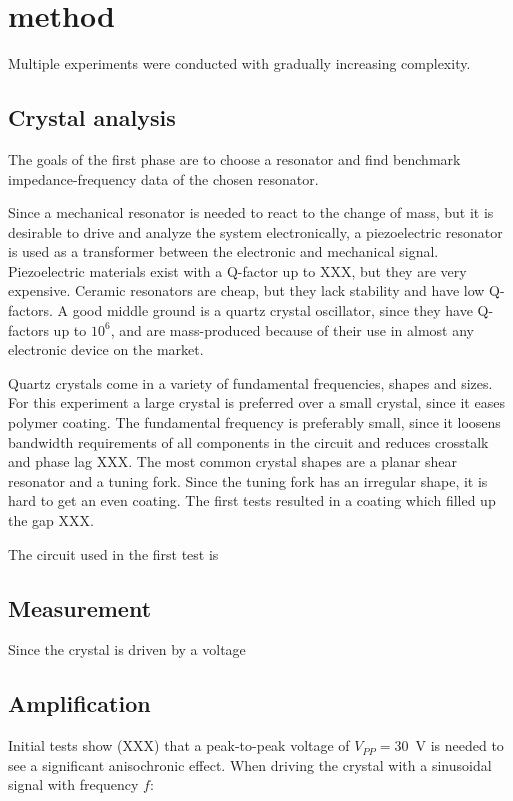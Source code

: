 \section{method}
Multiple experiments were conducted with gradually increasing complexity. 

\subsection{Crystal analysis}
The goals of the first phase are to choose a resonator and find benchmark impedance-frequency data of the chosen resonator. 

Since a mechanical resonator is needed to react to the change of mass, but it is desirable to drive and analyze the system electronically, a piezoelectric resonator is used as a transformer between the electronic and mechanical signal. Piezoelectric materials exist with a Q-factor up to XXX, but they are very expensive. Ceramic resonators are cheap, but they lack stability and have low Q-factors. A good middle ground is a quartz crystal oscillator, since they have Q-factors up to $10^6$, and are mass-produced because of their use in almost any electronic device on the market. 

Quartz crystals come in a variety of fundamental frequencies, shapes and sizes. For this experiment a large crystal is preferred over a small crystal, since it eases polymer coating. The fundamental frequency is preferably small, since it loosens bandwidth requirements of all components in the circuit and reduces crosstalk and phase lag XXX. The most common crystal shapes are a planar shear resonator and a tuning fork. Since the tuning fork has an irregular shape, it is hard to get an even coating. The first tests resulted in a coating which filled up the gap XXX. 

The circuit used in the first test is 

\subsection{Measurement}
Since the crystal is driven by a voltage 

\subsection{Amplification}
Initial tests show (XXX) that a peak-to-peak voltage of $V_{PP} = 30$~V is needed to see a significant anisochronic effect. When driving the crystal with a sinusoidal signal with frequency $f$:

